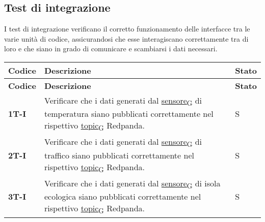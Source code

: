 \subsection{Test di integrazione}
I test di integrazione verificano il corretto funzionamento delle interfacce tra le varie unità di codice,
assicurandosi che esse interagiscano correttamente tra di loro e che siano in grado di comunicare e scambiarsi i dati necessari. \\
\begin{longtable}{|>{\raggedright\arraybackslash}m{}|>{\raggedright\arraybackslash}m{}|>{\raggedright\arraybackslash}m{}|}
	\hline
	\textbf{Codice} & \textbf{Descrizione}                                                                                                                                                                                                                                                                                                                & \textbf{Stato} \\
	\hline
	\endfirsthead
	\hline
	\textbf{Codice} & \textbf{Descrizione}                                                                                                                                                                                                                                                                                                                & \textbf{Stato} \\
	\endhead
	\multicolumn{3}{|c|}{\textbf{Python}}
	\hline
	\textbf{1T-I}   & Verificare che i dati generati dal \href{https://7last.github.io/docs/rtb/documentazione-interna/glossario\#sensore}{sensore\textsubscript{G}} di temperatura siano pubblicati correttamente nel rispettivo \href{https://7last.github.io/docs/rtb/documentazione-interna/glossario\#topic}{topic\textsubscript{G}} Redpanda.       & S              \\
	\hline
	\textbf{2T-I}   & Verificare che i dati generati dal \href{https://7last.github.io/docs/rtb/documentazione-interna/glossario\#sensore}{sensore\textsubscript{G}} di traffico siano pubblicati correttamente nel rispettivo \href{https://7last.github.io/docs/rtb/documentazione-interna/glossario\#topic}{topic\textsubscript{G}} Redpanda.          & S              \\
	\hline
	\textbf{3T-I}   & Verificare che i dati generati dal \href{https://7last.github.io/docs/rtb/documentazione-interna/glossario\#sensore}{sensore\textsubscript{G}} di isola ecologica siano pubblicati correttamente nel rispettivo \href{https://7last.github.io/docs/rtb/documentazione-interna/glossario\#topic}{topic\textsubscript{G}} Redpanda.   & S              \\

\end{longtable}
